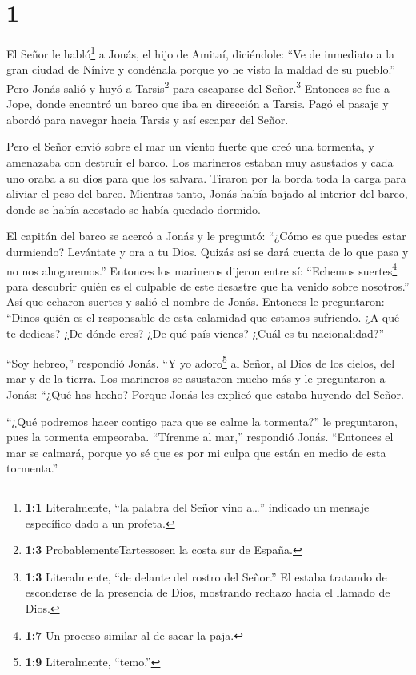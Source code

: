 \hypertarget{section}{%
\section{1}\label{section}}

 El Señor le habló\footnote{\textbf{1:1} Literalmente, ``la
  palabra del Señor vino a\ldots{}'' indicado un mensaje específico dado
  a un profeta.} a Jonás, el hijo de Amitaí, diciéndole: 
``Ve de inmediato a la gran ciudad de Nínive y condénala porque yo he
visto la maldad de su pueblo.''  Pero Jonás salió y huyó a
Tarsis\footnote{\textbf{1:3} ProbablementeTartessosen la costa sur de
  España.} para escaparse del Señor.\footnote{\textbf{1:3} Literalmente,
  ``de delante del rostro del Señor.'' El estaba tratando de esconderse
  de la presencia de Dios, mostrando rechazo hacia el llamado de Dios.}
Entonces se fue a Jope, donde encontró un barco que iba en dirección a
Tarsis. Pagó el pasaje y abordó para navegar hacia Tarsis y así escapar
del Señor.

 Pero el Señor envió sobre el mar un viento fuerte que creó
una tormenta, y amenazaba con destruir el barco.  Los
marineros estaban muy asustados y cada uno oraba a su dios para que los
salvara. Tiraron por la borda toda la carga para aliviar el peso del
barco. Mientras tanto, Jonás había bajado al interior del barco, donde
se había acostado se había quedado dormido.

 El capitán del barco se acercó a Jonás y le preguntó:
``¿Cómo es que puedes estar durmiendo? Levántate y ora a tu Dios. Quizás
así se dará cuenta de lo que pasa y no nos ahogaremos.'' 
Entonces los marineros dijeron entre sí: ``Echemos suertes\footnote{\textbf{1:7}
  Un proceso similar al de sacar la paja.} para descubrir quién es el
culpable de este desastre que ha venido sobre nosotros.'' Así que
echaron suertes y salió el nombre de Jonás.  Entonces le
preguntaron: ``Dinos quién es el responsable de esta calamidad que
estamos sufriendo. ¿A qué te dedicas? ¿De dónde eres? ¿De qué país
vienes? ¿Cuál es tu nacionalidad?''

 ``Soy hebreo,'' respondió Jonás. ``Y yo adoro\footnote{\textbf{1:9}
  Literalmente, ``temo.''} al Señor, al Dios de los cielos, del mar y de
la tierra.  Los marineros se asustaron mucho más y le
preguntaron a Jonás: ``¿Qué has hecho? Porque Jonás les explicó que
estaba huyendo del Señor.

 ``¿Qué podremos hacer contigo para que se calme la
tormenta?'' le preguntaron, pues la tormenta empeoraba. 
``Tírenme al mar,'' respondió Jonás. ``Entonces el mar se calmará,
porque yo sé que es por mi culpa que están en medio de esta tormenta.''

